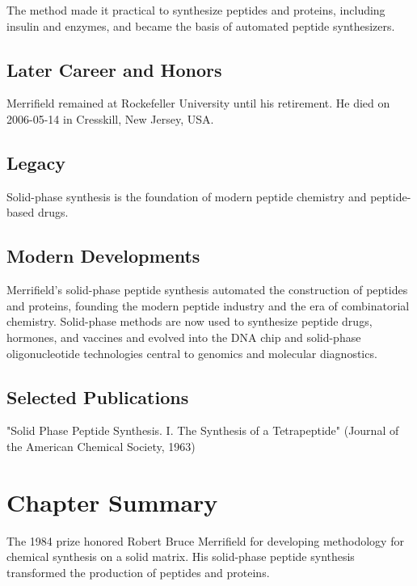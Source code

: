 The method made it practical to synthesize peptides and proteins, including insulin and enzymes, and became the basis of automated peptide synthesizers.

\subsection*{Later Career and Honors}

Merrifield remained at Rockefeller University until his retirement. He died on 2006-05-14 in Cresskill, New Jersey, USA.

\subsection*{Legacy}

Solid-phase synthesis is the foundation of modern peptide chemistry and peptide-based drugs.

\subsection*{Modern Developments}

Merrifield's solid-phase peptide synthesis automated the construction of peptides and proteins, founding the modern peptide industry and the era of combinatorial chemistry. Solid-phase methods are now used to synthesize peptide drugs, hormones, and vaccines and evolved into the DNA chip and solid-phase oligonucleotide technologies central to genomics and molecular diagnostics.

\subsection*{Selected Publications}

"Solid Phase Peptide Synthesis. I. The Synthesis of a Tetrapeptide" (Journal of the American Chemical Society, 1963)

\clearpage

\section*{Chapter Summary}

The 1984 prize honored Robert Bruce Merrifield for developing methodology for chemical synthesis on a solid matrix. His solid-phase peptide synthesis transformed the production of peptides and proteins.

